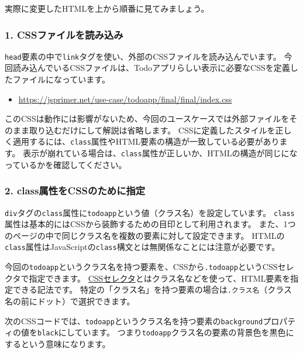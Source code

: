 実際に変更したHTMLを上から順番に見てみましょう。

\hypertarget{comment-css-file-load}{%
\subsubsection{1. CSSファイルを読み込み}\label{comment-css-file-load}}

\texttt{head}要素の中で\texttt{link}タグを使い、外部のCSSファイルを読み込んでいます。
今回読み込んでいるCSSファイルは、Todoアプリらしい表示に必要なCSSを定義したファイルになっています。

\begin{itemize}
\item
  \url{https://jsprimer.net/use-case/todoapp/final/final/index.css}
\end{itemize}

このCSSは動作には影響がないため、今回のユースケースでは外部ファイルをそのまま取り込むだけにして解説は省略します。
CSSに定義したスタイルを正しく適用するには、\texttt{class}属性やHTML要素の構造が一致している必要があります。
表示が崩れている場合は、\texttt{class}属性が正しいか、HTMLの構造が同じになっているかを確認してください。

\hypertarget{comment-class-for-css}{%
\subsubsection{2. class属性をCSSのために指定}\label{comment-class-for-css}}

\texttt{div}タグの\texttt{class}属性に\texttt{todoapp}という値（クラス名）を設定しています。
\texttt{class}属性は基本的にはCSSから装飾するための目印として利用されます。
また、1つのページの中で同じクラス名を複数の要素に対して設定できます。
HTMLの\texttt{class}属性はJavaScriptの\texttt{class}構文とは無関係なことには注意が必要です。

今回の\texttt{todoapp}というクラス名を持つ要素を、CSSから\texttt{.todoapp}というCSSセレクタで指定できます。
\href{https://developer.mozilla.org/ja/docs/Learn/CSS/Introduction_to_CSS/Selectors}{CSSセレクタ}とはクラス名などを使って、HTML要素を指定できる記法です。
特定の「クラス名」を持つ要素の場合は\texttt{.\hbox{}クラス名}（クラス名の前にドット）で選択できます。

次のCSSコードでは、\texttt{todoapp}というクラス名を持つ要素の\texttt{background}プロパティの値を\texttt{black}にしています。
つまり\texttt{todoapp}クラス名の要素の背景色を黒色にするという意味になります。

